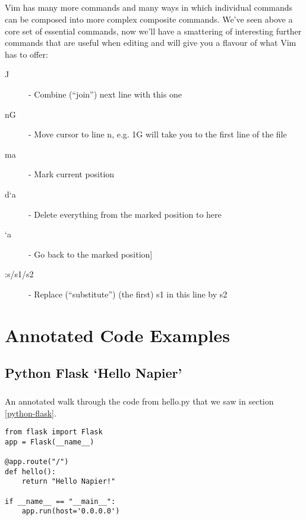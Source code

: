 \documentclass[12pt, a4paper, twoside]{book}
\begin{document}
\paragraph{} Vim has many more commands and many ways in which individual commands can be composed into more complex composite commands. We've seen above a core set of essential commands, now we'll have a smattering of interesting further commands that are useful when editing and will give you a flavour of what Vim has to offer:
\begin{description}
\item[J] - Combine (``join'') next line with this one
\item[nG] - Move cursor to line n, e.g. 1G will take you to the first line of the file
\item[ma] - Mark current position
\item[d`a] - Delete everything from the marked position to here
\item[`a] -  Go back to the marked position] 
\item[:s/s1/s2] - Replace (``substitute'') (the first) s1 in this line by s2
\end{description}


\chapter{Annotated Code Examples}
\label{annotated}

\section{Python Flask `Hello Napier'}
\label{annotated_hello_napier}
\paragraph{} An annotated walk through the code from hello.py that we saw in section \ref{python-flask}.

\begin{lstlisting}
from flask import Flask 
app = Flask(__name__)

@app.route("/")
def hello():
    return "Hello Napier!"

if __name__ == "__main__":
    app.run(host='0.0.0.0')

\end{lstlisting}
\end{document}

